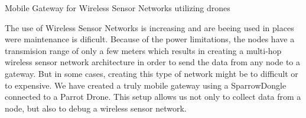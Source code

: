 Mobile Gateway for Wireless Sensor Networks utilizing drones

The use of Wireless Sensor Networks is increasing and are beeing used in places were maintenance is dificult. Because of the power limitations, the nodes have a transmision range of only a few meters which results in creating a multi-hop wireless sensor network architecture in order to send the data from any node to a gateway. But in some cases, creating this type of network might be to difficult or to expensive. We have created a truly mobile gateway using a SparrowDongle connected to a Parrot Drone. This setup allows us not only to collect data from a node, but also to debug a wireless sensor network.
